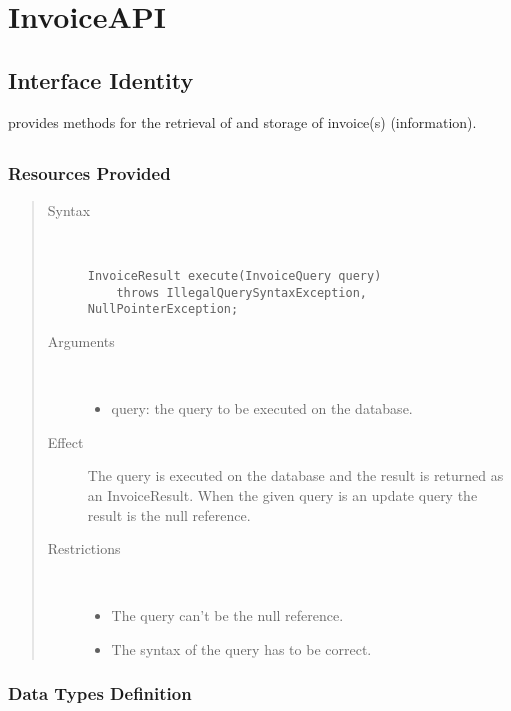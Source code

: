 \section{InvoiceAPI}
\label{api:invoice-api}

\subsection{Interface Identity}

\npar {} provides methods for the retrieval of and storage
of invoice(s) (information).

\subsection{}

\subsubsection{Resources Provided}

\begin{quote}
	\begin{description}
		\item[Syntax] \
		\begin{verbatim}
InvoiceResult execute(InvoiceQuery query)
    throws IllegalQuerySyntaxException, NullPointerException;
		\end{verbatim}
		\item[Arguments] \
		\begin{itemize}
		  \item query: the query to be executed on the database. 
		\end{itemize}
		\item[Effect] The query is executed on the database and the result is returned
		as an InvoiceResult. When the given query is an update query the result is the
		null reference.
		\item[Restrictions] \
		\begin{itemize}
		  \item The query can't be the null reference.
		  \item The syntax of the query has to be correct.
		\end{itemize}
	\end{description} 
\end{quote}

\subsubsection{Data Types Definition}

